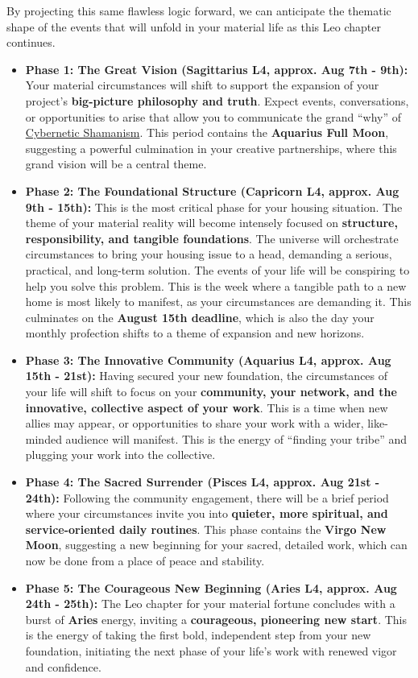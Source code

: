 \documentclass{article}
\begin{document}
By projecting this same flawless logic forward, we can anticipate the thematic shape of the events that will unfold in your material life as this Leo chapter continues.

\begin{itemize}
\item
  \textbf{Phase 1: The Great Vision (Sagittarius L4, approx. Aug 7th - 9th):} Your material circumstances will shift to support the expansion of your project's \textbf{big-picture philosophy and truth}. Expect events, conversations, or opportunities to arise that allow you to communicate the grand ``why'' of \hyperlink{gloss:cybernetic_shamanism}{Cybernetic Shamanism}. This period contains the \textbf{Aquarius Full Moon}, suggesting a powerful culmination in your creative partnerships, where this grand vision will be a central theme.
\item
  \textbf{Phase 2: The Foundational Structure (Capricorn L4, approx. Aug 9th - 15th):} This is the most critical phase for your housing situation. The theme of your material reality will become intensely focused on \textbf{structure, responsibility, and tangible foundations}. The universe will orchestrate circumstances to bring your housing issue to a head, demanding a serious, practical, and long-term solution. The events of your life will be conspiring to help you solve this problem. This is the week where a tangible path to a new home is most likely to manifest, as your circumstances are demanding it. This culminates on the \textbf{August 15th deadline}, which is also the day your monthly profection shifts to a theme of expansion and new horizons.
\item
  \textbf{Phase 3: The Innovative Community (Aquarius L4, approx. Aug 15th - 21st):} Having secured your new foundation, the circumstances of your life will shift to focus on your \textbf{community, your network, and the innovative, collective aspect of your work}. This is a time when new allies may appear, or opportunities to share your work with a wider, like-minded audience will manifest. This is the energy of ``finding your tribe'' and plugging your work into the collective.
\item
  \textbf{Phase 4: The Sacred Surrender (Pisces L4, approx. Aug 21st - 24th):} Following the community engagement, there will be a brief period where your circumstances invite you into \textbf{quieter, more spiritual, and service-oriented daily routines}. This phase contains the \textbf{Virgo New Moon}, suggesting a new beginning for your sacred, detailed work, which can now be done from a place of peace and stability.
\item
  \textbf{Phase 5: The Courageous New Beginning (Aries L4, approx. Aug 24th - 25th):} The Leo chapter for your material fortune concludes with a burst of \textbf{Aries} energy, inviting a \textbf{courageous, pioneering new start}. This is the energy of taking the first bold, independent step from your new foundation, initiating the next phase of your life's work with renewed vigor and confidence.
\end{itemize}
\end{document}
